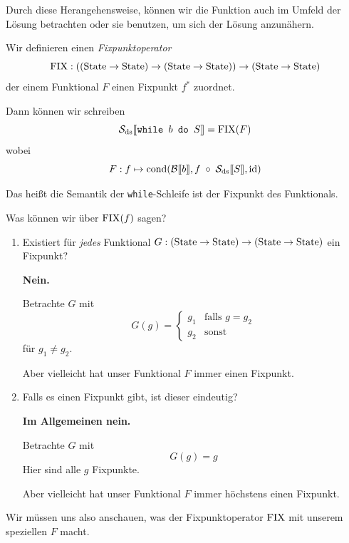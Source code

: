 Durch diese Herangehensweise, können wir die Funktion auch im Umfeld der Lösung betrachten oder sie benutzen, um sich der Lösung anzunähern.

\begin{definition}
    Wir definieren einen \emph{Fixpunktoperator} \[
        \operatorname{FIX} : ((\operatorname{State} \to \operatorname{State}) \to (\operatorname{State} \to \operatorname{State})) \to (\operatorname{State} \to \operatorname{State})
    \]
    der einem Funktional $F$ einen Fixpunkt $f^*$ zuordnet.

    Dann können wir schreiben \[
        \mathcal{S}_{\text{ds}}\mathrm{[}\kern-.14em\mathrm{[}\texttt{while $b$ do $S$}\mathrm{]}\kern-.14em\mathrm{]} = \operatorname{FIX}(F)
    \]
    wobei \[
        F : f \mapsto \operatorname{cond}(\mathcal{B}\mathrm{[}\kern-.14em\mathrm{[} b\mathrm{]}\kern-.14em\mathrm{]}, f \;\circ\; \mathcal{S}_{\text{ds}}\mathrm{[}\kern-.14em\mathrm{[} S\mathrm{]}\kern-.14em\mathrm{]}, \operatorname{id})
    \]
\end{definition}

Das heißt die Semantik der \texttt{while}-Schleife ist der Fixpunkt des Funktionals.

\begin{question}
    Was können wir über $\operatorname{FIX}(f)$ sagen?
    \begin{enumerate}
        \item Existiert für \emph{jedes} Funktional $G : (\operatorname{State} \to \operatorname{State}) \to (\operatorname{State} \to \operatorname{State})$ ein Fixpunkt?

            \textbf{Nein.}

            Betrachte $G$ mit \[
                G(g) = \begin{cases}
                    g_1 & \text{falls } g = g_2 \\
                    g_2 & \text{sonst}
                \end{cases}
            \]
            für $g_1 \neq g_2$.

            Aber vielleicht hat unser Funktional $F$ immer einen Fixpunkt.

        \item Falls es einen Fixpunkt gibt, ist dieser eindeutig?

            \textbf{Im Allgemeinen nein.}

            Betrachte $G$ mit \[ G(g) = g \] Hier sind alle $g$ Fixpunkte.

            Aber vielleicht hat unser Funktional $F$ immer höchstens einen Fixpunkt.
    \end{enumerate}
\end{question}

\par\bigskip
Wir müssen uns also anschauen, was der Fixpunktoperator $\operatorname{FIX}$ mit unserem speziellen $F$ macht.

